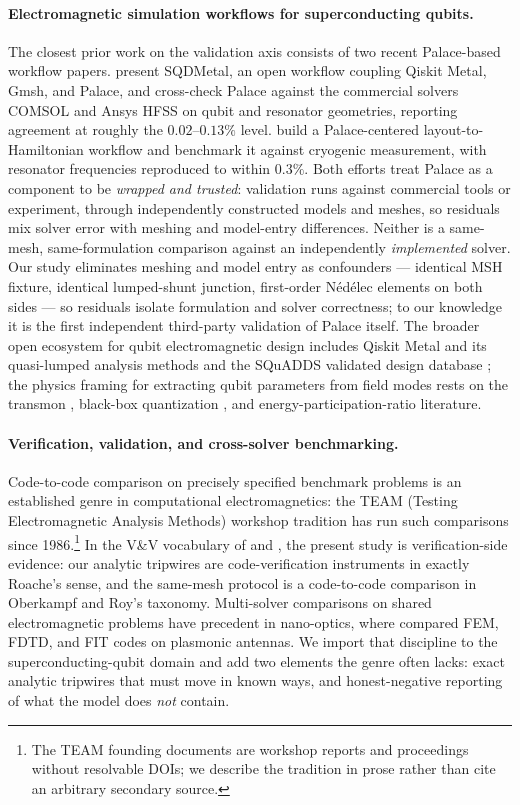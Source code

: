 \documentclass{anvil-paper}
\begin{document}
\paragraph{Electromagnetic simulation workflows for superconducting qubits.}
The closest prior work on the validation axis consists of two recent
Palace-based workflow papers. \citet{sommers2025open} present SQDMetal,
an open workflow coupling Qiskit Metal, Gmsh, and Palace, and cross-check
Palace against the commercial solvers COMSOL and Ansys HFSS on qubit and
resonator geometries, reporting agreement at roughly the $0.02$--$0.13\%$
level. \citet{ye2025electromagnetic} build a Palace-centered
layout-to-Hamiltonian workflow and benchmark it against cryogenic
measurement, with resonator frequencies reproduced to within $0.3\%$. Both
efforts treat Palace as a component to be \emph{wrapped and trusted}:
validation runs against commercial tools or experiment, through
independently constructed models and meshes, so residuals mix solver error
with meshing and model-entry differences. Neither is a same-mesh,
same-formulation comparison against an independently \emph{implemented}
solver. Our study eliminates meshing and model entry as confounders ---
identical MSH fixture, identical lumped-shunt junction, first-order
N\'ed\'elec elements on both sides --- so residuals isolate formulation
and solver correctness; to our knowledge it is the first independent
third-party validation of Palace itself. The broader open ecosystem for
qubit electromagnetic design includes Qiskit Metal and its quasi-lumped
analysis methods \citep{minev2021circuit} and the SQuADDS validated design
database \citep{shanto2024squadds}; the physics framing for extracting
qubit parameters from field modes rests on the transmon \citep{koch2007},
black-box quantization \citep{nigg2012}, and energy-participation-ratio
\citep{minev2021} literature.

\paragraph{Verification, validation, and cross-solver benchmarking.}
Code-to-code comparison on precisely specified benchmark problems is an
established genre in computational electromagnetics: the TEAM (Testing
Electromagnetic Analysis Methods) workshop tradition has run such
comparisons since 1986.\footnote{The TEAM founding documents are workshop
reports and proceedings without resolvable DOIs; we describe the tradition
in prose rather than cite an arbitrary secondary source.} In the V\&V
vocabulary of \citet{roache1997quantification} and
\citet{oberkampf2010verification}, the present study is
verification-side evidence: our analytic tripwires are code-verification
instruments in exactly Roache's sense, and the same-mesh protocol is a
code-to-code comparison in Oberkampf and Roy's taxonomy. Multi-solver
comparisons on shared electromagnetic problems have precedent in
nano-optics, where \citet{hoffmann2009comparison} compared FEM, FDTD, and
FIT codes on plasmonic antennas. We import that discipline to the
superconducting-qubit domain and add two elements the genre often lacks:
exact analytic tripwires that must move in known ways, and honest-negative
reporting of what the model does \emph{not} contain.
\end{document}
